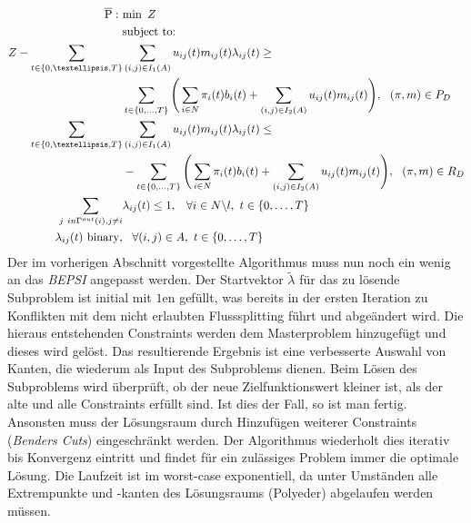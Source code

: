 \documentclass[a4paper, 11pt]{scrreprt}
\begin{document}
\begin{align}
  \overline{\text{P}}:\,\,&\text{min}\,\,\, Z\label{eq:z}\\
  &\text{subject to:}  \notag\\
  Z - \sum_{t \in \{0,…,T\}}&\sum_{(i,j) \in I_1(A)} u_{ij}(t)m_{ij}(t)\lambda_{ij}(t) \geq\notag\\ &\sum_{t\in\{0,\dots,T\}} \Bigg(\sum_{i \in N}\pi_i(t)b_i(t) + \sum_{(i,j)\in I_2(A)}u_{ij}(t)m_{ij}(t)\Bigg), \,\,\,\, (\pi,m) \in P_D\label{eq:cut_opti}\\
  \sum_{t \in \{0,…,T\}}&\sum_{(i,j) \in I_1(A)} u_{ij}(t)m_{ij}(t)\lambda_{ij}(t) \leq\notag\\  & - \sum_{t\in\{0,\dots,T\}} \Bigg(\sum_{i \in N}\pi_i(t)b_i(t) + \sum_{(i,j)\in I_2(A)}u_{ij}(t)m_{ij}(t)\Bigg), \,\,\,\, (\pi,m) \in R_D\label{eq:cut_feas}\\
  \sum_{j \ in \Gamma^{out}(i), j\neq i} &\lambda_{ij}(t) \leq 1, \,\,\,\,\, \forall i \in N \backslash l,\,\, t \in \{0,\dots,T\}\\
  \lambda_{ij}(t) \,\, \text{binary}, & \,\,\,\,\, \forall (i,j) \in A, \,\, t \in \{0,\dots,T\}
\end{align}
Der im vorherigen Abschnitt vorgestellte Algorithmus muss nun noch ein wenig an das \textit{BEPSI}
angepasst werden. Der Startvektor $\tilde{\lambda}$ für das zu lösende Subproblem ist initial mit $1$en
gefüllt, was bereits
in der ersten Iteration zu Konflikten mit dem nicht erlaubten Flusssplitting führt und abgeändert wird.
Die hieraus entstehenden Constraints werden dem Masterproblem hinzugefügt und dieses wird gelöst.
Das resultierende Ergebnis ist eine verbesserte Auswahl von Kanten, die wiederum als Input
des Subproblems dienen.
Beim Lösen des Subproblems wird überprüft, ob der neue Zielfunktionswert kleiner ist, als der alte und
alle Constraints erfüllt sind. Ist dies der Fall, so ist man fertig.
Ansonsten muss der Lösungsraum durch Hinzufügen weiterer Constraints (\textit{Benders Cuts}) eingeschränkt werden.
Der Algorithmus wiederholt dies iterativ bis Konvergenz eintritt und findet für ein zulässiges Problem
immer die optimale Lösung. Die Laufzeit ist im worst-case exponentiell, da unter Umständen alle
Extrempunkte und -kanten des Lösungsraums (Polyeder) abgelaufen werden müssen.
\end{document}
